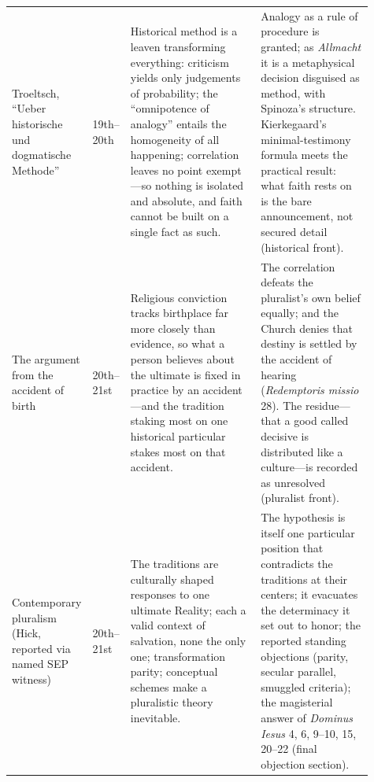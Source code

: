 \begin{longtable}{>{\raggedright\arraybackslash}p{0.14\linewidth}>{\raggedright\arraybackslash}p{0.10\linewidth}>{\raggedright\arraybackslash}p{0.36\linewidth}>{\raggedright\arraybackslash}p{0.31\linewidth}}
Troeltsch, ``Ueber historische und dogmatische Methode'' & 19th--20th & Historical method is a leaven transforming everything: criticism yields only judgements of probability; the ``omnipotence of analogy'' entails the homogeneity of all happening; correlation leaves no point exempt---so nothing is isolated and absolute, and faith cannot be built on a single fact as such. & Analogy as a rule of procedure is granted; as \emph{Allmacht} it is a metaphysical decision disguised as method, with Spinoza's structure. Kierkegaard's minimal-testimony formula meets the practical result: what faith rests on is the bare announcement, not secured detail (historical front).\\
The argument from the accident of birth & 20th--21st & Religious conviction tracks birthplace far more closely than evidence, so what a person believes about the ultimate is fixed in practice by an accident---and the tradition staking most on one historical particular stakes most on that accident. & The correlation defeats the pluralist's own belief equally; and the Church denies that destiny is settled by the accident of hearing (\emph{Redemptoris missio} 28). The residue---that a good called decisive is distributed like a culture---is recorded as unresolved (pluralist front).\\
Contemporary pluralism (Hick, reported via named SEP witness) & 20th--21st & The traditions are culturally shaped responses to one ultimate Reality; each a valid context of salvation, none the only one; transformation parity; conceptual schemes make a pluralistic theory inevitable. & The hypothesis is itself one particular position that contradicts the traditions at their centers; it evacuates the determinacy it set out to honor; the reported standing objections (parity, secular parallel, smuggled criteria); the magisterial answer of \emph{Dominus Iesus} 4, 6, 9--10, 15, 20--22 (final objection section).\\
\end{longtable}
\endgroup
